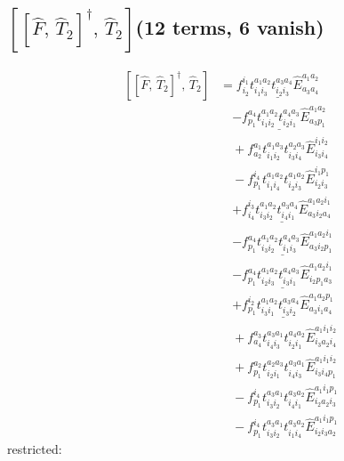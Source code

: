 \documentclass[11pt]{article}
\begin{document}
\subsection*{$\left[\left[\hat{F},\, \hat{T}_{2}\right]^{\dagger},\, \hat{T}_{2}\right]$\quad(12 terms, 6 vanish)}
\begin{align}
\left[\left[\hat{F},\, \hat{T}_{2}\right]^{\dagger},\, \hat{T}_{2}\right] &= \underline{f^{i_{1}}_{i_{2}} t^{a_{1}a_{2}}_{i_{1}i_{3}} t^{a_{3}a_{4}}_{i_{2}i_{3}} \hat{E}^{a_{1}a_{2}}_{a_{3}a_{4}}} \\
&\quad \underline{- f^{a_{4}}_{p_{1}} t^{a_{1}a_{2}}_{i_{1}i_{2}} t^{a_{4}a_{3}}_{i_{2}i_{1}} \hat{E}^{a_{1}a_{2}}_{a_{3}p_{1}}} \\
&\quad + f^{a_{1}}_{a_{2}} t^{a_{1}a_{3}}_{i_{1}i_{2}} t^{a_{2}a_{3}}_{i_{3}i_{4}} \hat{E}^{i_{1}i_{2}}_{i_{3}i_{4}} \\
&\quad - f^{i_{4}}_{p_{1}} t^{a_{1}a_{2}}_{i_{1}i_{4}} t^{a_{1}a_{2}}_{i_{2}i_{3}} \hat{E}^{i_{1}p_{1}}_{i_{2}i_{3}} \\
&\quad \underline{+ f^{i_{3}}_{i_{4}} t^{a_{1}a_{2}}_{i_{3}i_{2}} t^{a_{3}a_{4}}_{i_{4}i_{1}} \hat{E}^{a_{1}a_{2}i_{1}}_{a_{3}i_{2}a_{4}}} \\
&\quad \underline{- f^{a_{4}}_{p_{1}} t^{a_{1}a_{2}}_{i_{3}i_{2}} t^{a_{4}a_{3}}_{i_{1}i_{3}} \hat{E}^{a_{1}a_{2}i_{1}}_{a_{3}i_{2}p_{1}}} \\
&\quad \underline{- f^{a_{4}}_{p_{1}} t^{a_{1}a_{2}}_{i_{2}i_{3}} t^{a_{4}a_{3}}_{i_{3}i_{1}} \hat{E}^{a_{1}a_{2}i_{1}}_{i_{2}p_{1}a_{3}}} \\
&\quad \underline{+ f^{i_{2}}_{p_{1}} t^{a_{1}a_{2}}_{i_{3}i_{1}} t^{a_{3}a_{4}}_{i_{3}i_{2}} \hat{E}^{a_{1}a_{2}p_{1}}_{a_{3}i_{1}a_{4}}} \\
&\quad + f^{a_{3}}_{a_{4}} t^{a_{3}a_{1}}_{i_{4}i_{3}} t^{a_{4}a_{2}}_{i_{2}i_{1}} \hat{E}^{a_{1}i_{1}i_{2}}_{i_{3}a_{2}i_{4}} \\
&\quad + f^{a_{2}}_{p_{1}} t^{a_{2}a_{3}}_{i_{2}i_{1}} t^{a_{3}a_{1}}_{i_{4}i_{3}} \hat{E}^{a_{1}i_{1}i_{2}}_{i_{3}i_{4}p_{1}} \\
&\quad - f^{i_{4}}_{p_{1}} t^{a_{3}a_{1}}_{i_{3}i_{2}} t^{a_{3}a_{2}}_{i_{4}i_{1}} \hat{E}^{a_{1}i_{1}p_{1}}_{i_{2}a_{2}i_{3}} \\
&\quad - f^{i_{4}}_{p_{1}} t^{a_{3}a_{1}}_{i_{3}i_{2}} t^{a_{3}a_{2}}_{i_{1}i_{4}} \hat{E}^{a_{1}i_{1}p_{1}}_{i_{2}i_{3}a_{2}}
\end{align}
restricted:
\end{document}
